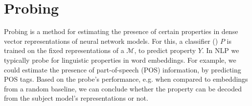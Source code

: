 \section{Probing}
Probing is a method for estimating the presence of certain properties in dense vector representations of neural network models. For this, a classifier () $P$ is trained on the fixed representations of a  $\mathcal{M}$, to predict property $Y$. In NLP we typically probe for linguistic properties in word embeddings. For example, we could estimate the presence of part-of-speech (POS) information, by predicting POS tags. Based on the probe's performance, e.g. when compared to embeddings from a random baseline, we can conclude whether the property can be decoded from the subject model's representations or not.